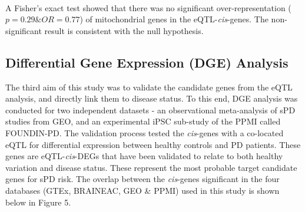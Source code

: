 \documentclass{article}
\begin{document}
\\A Fisher's exact test showed that there was no significant over-representation ($p = 0.29 \& OR = 0.77$) of mitochondrial genes in the eQTL-\textit{cis}-genes. The non-significant result is consistent with the null hypothesis. 
\subsection{Differential Gene Expression (DGE) Analysis}
\label{subsec:DGE}
The third aim of this study was to validate the candidate genes from the eQTL analysis, and directly link them to disease status. To this end, DGE analysis was conducted for two independent datasets - an observational meta-analysis of sPD studies from GEO\cite{Barrett2012NCBISetsupdate}, and an experimental iPSC sub-study of the PPMI called FOUNDIN-PD\cite{Bressan2023TheMechanism}. The validation process tested the \textit{cis}-genes with a co-located eQTL for differential expression between healthy controls and PD patients. These genes are  eQTL-\textit{cis}-DEGs that have been validated to relate to both healthy variation and disease status. These represent the most probable target candidate genes for sPD risk. The overlap between the \textit{cis}-genes significant in the four databases (GTEx, BRAINEAC, GEO \& PPMI) used in this study is shown below in Figure 5.
\newpage
\end{document}
